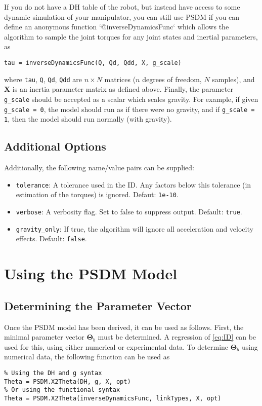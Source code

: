 \documentclass[12pt]{article}
\renewcommand{\b}[1]{\mathbf{#1}}
\begin{document}
If you do not have a DH table of the robot, but instead have access to some dynamic simulation of your manipulator, you can still use PSDM if you can define an anonymous function `@inverseDynamicsFunc` which allows the algorithm to sample the joint torques for any joint states and inertial parameters, as
\begin{lstlisting}
tau = inverseDynamicsFunc(Q, Qd, Qdd, X, g_scale)
\end{lstlisting}
where \texttt{tau}, \texttt{Q}, \texttt{Qd}, \texttt{Qdd} are $n \times N$ matrices ($n$ degrees of freedom, $N$ samples), and $\mathbf{X}$ is an inertia parameter matrix as defined above. Finally, the parameter \texttt{g\_scale} should be accepted as a scalar which scales gravity. For example, if given \texttt{g\_scale = 0}, the model should run as if there were no gravity, and if \texttt{g\_scale = 1}, then the model should run normally (with gravity).

\subsection{Additional Options}

Additionally, the following name/value pairs can be supplied:
\begin{itemize}[nosep]
	\item \texttt{tolerance}: A tolerance used in the ID. Any factors below this tolerance (in estimation of the torques) is ignored. Defaut: \texttt{1e-10}.
	\item \texttt{verbose}: A verbosity flag. Set to false to suppress output. Default: \texttt{true}.
	\item \texttt{gravity\_only}: If true, the algorithm will ignore all acceleration  and velocity effects. Default: \texttt{false}.
\end{itemize}

\section{Using the PSDM Model}

\subsection{Determining the Parameter Vector}

Once the PSDM model has been derived, it can be used as follows. First, the minimal parameter vector $\b{\Theta}_b$ must be determined. A regression of \cref{eq:ID} can be used for this, using either numerical or experimental data. To determine $\b{\Theta}_b$ using numerical data, the following function can be used as
\begin{lstlisting}
% Using the DH and g syntax
Theta = PSDM.X2Theta(DH, g, X, opt)
% Or using the functional syntax
Theta = PSDM.X2Theta(inverseDynamicsFunc, linkTypes, X, opt)
\end{lstlisting}
\end{document}
